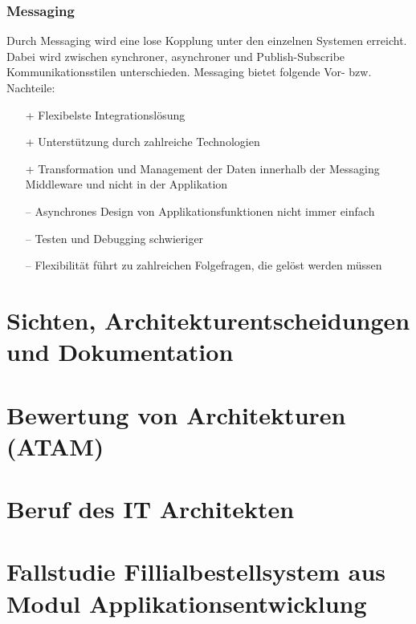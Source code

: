 \subsubsection{Messaging}

Durch Messaging wird eine lose Kopplung unter den einzelnen Systemen erreicht. Dabei wird zwischen synchroner, asynchroner und Publish-Subscribe Kommunikationsstilen unterschieden. Messaging bietet folgende Vor- bzw. Nachteile:
\begin{itemize}
	\item[+] Flexibelste Integrationslösung
	\item[+] Unterstützung durch zahlreiche Technologien
	\item[+] Transformation und Management der Daten innerhalb der Messaging Middleware und nicht in der Applikation
	\item[--] Asynchrones Design von Applikationsfunktionen nicht immer einfach
	\item[--] Testen und Debugging schwieriger
	\item[--] Flexibilität führt zu zahlreichen Folgefragen, die gelöst werden müssen
\end{itemize}

\section{Sichten, Architekturentscheidungen und Dokumentation}

\section{Bewertung von Architekturen (ATAM)}

\section{Beruf des IT Architekten}

\section{Fallstudie Fillialbestellsystem aus Modul Applikationsentwicklung}